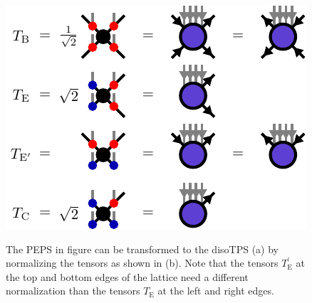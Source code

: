 \begin{figure}
	\centering
	\subcaptionbox{\label{fig:toric_code_YB_isoTPS_representation}}
	{%
		\usebox{\largestimage}
	}
	\quad\quad\quad
	\subcaptionbox{\label{fig:toric_code_YB_isoTPS_representation_tensor_definitions}}
	{%
		\raisebox{\dimexpr.5\ht\largestimage-.5\height}
		{%
			\includegraphics[scale=1]{figures/tikz/toric_code/YB_isoTPS_representation/YB_isoTPS_representation_b.pdf}
		}
	}
	\caption{The PEPS in figure \protect{} can be transformed to the disoTPS (a) by normalizing the tensors as shown in (b). Note that the tensors $T_\text{E}^\prime$ at the top and bottom edges of the lattice need a different normalization than the tensors $T_\text{E}$ at the left and right edges.}
	\label{fig:toric_code_YB_isoTPS}
\end{figure}
